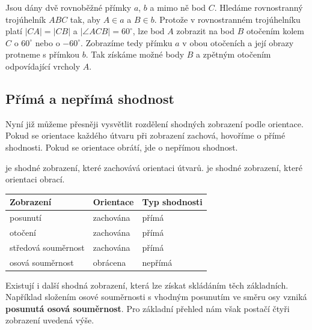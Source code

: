 \documentclass[12pt,a4paper]{article}
\begin{document}
\begin{examplebox}
    Jsou dány dvě rovnoběžné přímky $a$, $b$ a mimo ně bod $C$. Hledáme rovnostranný trojúhelník $ABC$ tak, aby $A\in a$ a $B\in b$. Protože v rovnostranném trojúhelníku platí $|CA|=|CB|$ a $|\angle ACB|=60^\circ$, lze bod $A$ zobrazit na bod $B$ otočením kolem $C$ o $60^\circ$ nebo o $-60^\circ$. Zobrazíme tedy přímku $a$ v obou otočeních a její obrazy protneme s přímkou $b$. Tak získáme možné body $B$ a zpětným otočením odpovídající vrcholy $A$.
\end{examplebox}


\subsection{Přímá a nepřímá shodnost}

Nyní již můžeme přesněji vysvětlit rozdělení shodných zobrazení podle orientace. Pokud se orientace každého útvaru při zobrazení zachová, hovoříme o přímé shodnosti. Pokud se orientace obrátí, jde o nepřímou shodnost.

\begin{definitionbox}
     je shodné zobrazení, které zachovává orientaci útvarů.  je shodné zobrazení, které orientaci obrací.
\end{definitionbox}

\begin{center}
\begin{tabular}{|C{4.7cm}|C{4.7cm}|C{4.0cm}|}
    \hline
    \textbf{Zobrazení} & \textbf{Orientace} & \textbf{Typ shodnosti} \\
    \hline
    posunutí & zachována & přímá \\
    \hline
    otočení & zachována & přímá \\
    \hline
    středová souměrnost & zachována & přímá \\
    \hline
    osová souměrnost & obrácena & nepřímá \\
    \hline
\end{tabular}
\end{center}

\begin{notebox}
    Existují i další shodná zobrazení, která lze získat skládáním těch základních. Například složením osové souměrnosti s vhodným posunutím ve směru osy vzniká \textbf{posunutá osová souměrnost}. Pro základní přehled nám však postačí čtyři zobrazení uvedená výše.
\end{notebox}
\end{document}
